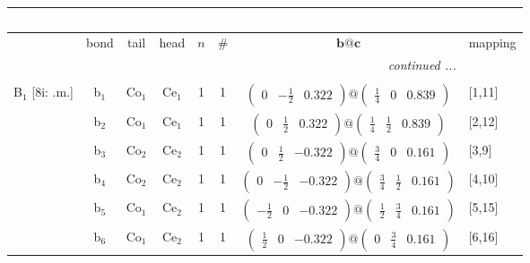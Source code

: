 \documentclass[fleqn,10pt,landscape]{article}
\begin{document}
\begin{itemize}
\begin{center}
\begin{longtable}{cc|cc|c|c|c|l}
\multicolumn{7}{l}{\tablename\ \thetable{}} \\
 \hline \hline
 & bond & tail & head & $n$ & \# & $\bm{b}@\bm{c}$ & mapping \\ \hline \endhead

 \hline \hline
\multicolumn{7}{r}{\footnotesize\it continued ...} \\ \endfoot

 \hline \hline
\multicolumn{7}{r}{} \\ \endlastfoot

B$_{1}$ [8i: .m.] & b$_{1}$ & Co$_{1}$ & Ce$_{1}$ & 1 & 1 & $\begin{pmatrix} 0 & - \frac{1}{2} & 0.322 \end{pmatrix}@\begin{pmatrix} \frac{1}{4} & 0 & 0.839 \end{pmatrix}$ & [1,11] \\
& b$_{2}$ & Co$_{1}$ & Ce$_{1}$ & 1 & 1 & $\begin{pmatrix} 0 & \frac{1}{2} & 0.322 \end{pmatrix}@\begin{pmatrix} \frac{1}{4} & \frac{1}{2} & 0.839 \end{pmatrix}$ & [2,12] \\
& b$_{3}$ & Co$_{2}$ & Ce$_{2}$ & 1 & 1 & $\begin{pmatrix} 0 & \frac{1}{2} & -0.322 \end{pmatrix}@\begin{pmatrix} \frac{3}{4} & 0 & 0.161 \end{pmatrix}$ & [3,9] \\
& b$_{4}$ & Co$_{2}$ & Ce$_{2}$ & 1 & 1 & $\begin{pmatrix} 0 & - \frac{1}{2} & -0.322 \end{pmatrix}@\begin{pmatrix} \frac{3}{4} & \frac{1}{2} & 0.161 \end{pmatrix}$ & [4,10] \\
& b$_{5}$ & Co$_{1}$ & Ce$_{2}$ & 1 & 1 & $\begin{pmatrix} - \frac{1}{2} & 0 & -0.322 \end{pmatrix}@\begin{pmatrix} \frac{1}{2} & \frac{3}{4} & 0.161 \end{pmatrix}$ & [5,15] \\
& b$_{6}$ & Co$_{1}$ & Ce$_{2}$ & 1 & 1 & $\begin{pmatrix} \frac{1}{2} & 0 & -0.322 \end{pmatrix}@\begin{pmatrix} 0 & \frac{3}{4} & 0.161 \end{pmatrix}$ & [6,16] \\

\end{longtable}
\end{center}
\end{itemize}
\end{document}
